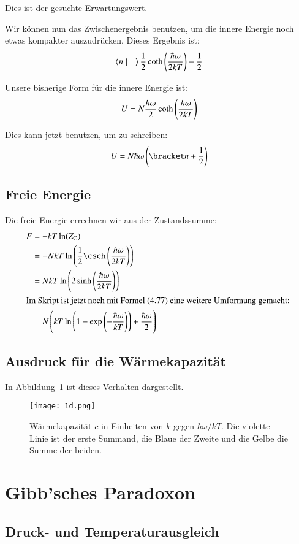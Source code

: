 Dies ist der gesuchte Erwartungswert.

Wir können nun das Zwischenergebnis benutzen, um die innere Energie noch etwas kompakter auszudrücken. Dieses Ergebnis ist:
\[
    \braket n = \frac12 \coth\del{\frac{\hbar\omega}{2kT}} - \frac 12
\]

Unsere bisherige Form für die innere Energie ist:
\[
    U = N \frac{\hbar\omega}2 \coth\del{\frac{\hbar\omega}{2kT}}
\]

Dies kann jetzt benutzen, um zu schreiben:
\[
    U = N \hbar \omega \del{\bracket n + \frac12}
\]

\subsection{Freie Energie}

Die freie Energie errechnen wir aus der Zustandssumme:
\begin{align*}
    F
    &= - k T \ln(\ZC) \\
    &= - N k T \ln\del{\frac 12 \csch\del{\frac{\hbar\omega}{2kT}}} \\
    &= N k T \ln\del{2 \sinh\del{\frac{\hbar\omega}{2kT}}} \\
    \intertext{%
        Im Skript ist jetzt noch mit Formel (4.77) eine weitere Umformung
        gemacht:
    }
    &= N \del{kT \ln\del{1 - \exp\del{-\frac{\hbar\omega}{kT}}} + \frac{\hbar\omega}2}
\end{align*}

\subsection{Ausdruck für die Wärmekapazität}

In Abbildung~\ref{fig:1d-c} ist dieses Verhalten dargestellt.

\begin{figure}[htbp]
    \centering
    \texttt{[image: 1d.png]}
    \caption{%
        Wärmekapazität $c$ in Einheiten von $k$ gegen $\hbar\omega / kT$. Die
        violette Linie ist der erste Summand, die Blaue der Zweite und die
        Gelbe die Summe der beiden.
    }
    \label{fig:1d-c}
\end{figure}

\section{Gibb'sches Paradoxon}

\subsection{Druck- und Temperaturausgleich}

